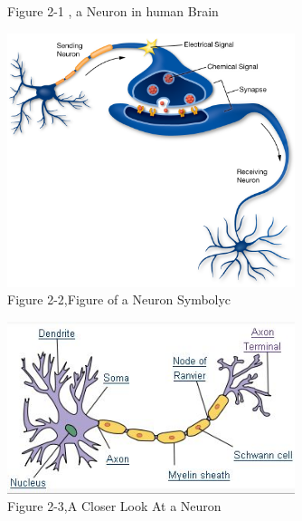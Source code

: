 \documentclass[12pt , a4paper]{article}
\begin{document}
\begin{figure}[h]
\centering
\setlength{\fboxrule}{5pt}
\caption*{Figure 2-1 , a Neuron in human Brain}
\label{f-1-2}
\end{figure}
%
\begin{figure}[h]
\centering
\includegraphics[width=0.75\textwidth,frame]{x.jpg}
\caption*{Figure 2-2,Figure of a Neuron Symbolyc}
\label{f-1-3}
\end{figure}

\begin{figure}[h]
\centering
\includegraphics[width=0.75\textwidth,frame]{Neuron.jpg}
\caption*{Figure 2-3,A Closer Look At a Neuron}
\label{f-1-4}
\end{figure}
\end{document}
